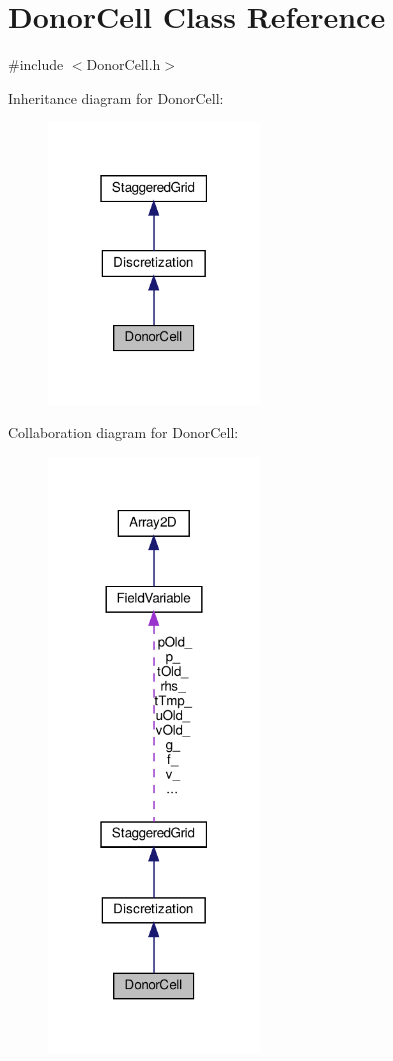 \hypertarget{classDonorCell}{}\section{Donor\+Cell Class Reference}
\label{classDonorCell}


{\ttfamily \#include $<$Donor\+Cell.\+h$>$}



Inheritance diagram for Donor\+Cell\+:
\nopagebreak
\begin{figure}[H]
\begin{center}
\leavevmode
\includegraphics[width=159pt]{classDonorCell__inherit__graph}
\end{center}
\end{figure}


Collaboration diagram for Donor\+Cell\+:
\nopagebreak
\begin{figure}[H]
\begin{center}
\leavevmode
\includegraphics[width=159pt]{classDonorCell__coll__graph}
\end{center}
\end{figure}
